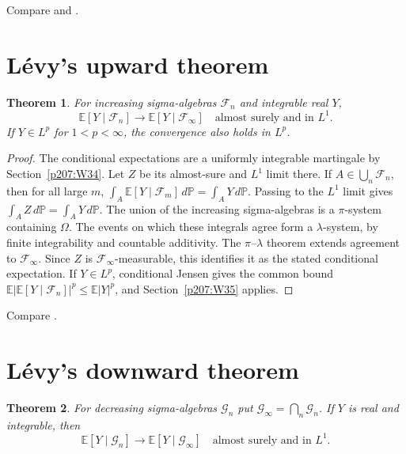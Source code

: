 \documentclass[11pt,oneside,openany]{book}
\theoremstyle{plain}
\newtheorem{theorem}{Theorem}[chapter]
\theoremstyle{definition}
\theoremstyle{remark}
\begin{document}
\noindent
Compare \cite[Chapter 14]{Williams} and
\cite[Corollary 9.23]{Kallenberg}.

\section{Lévy's upward theorem}
\label{p207:W36}

\begin{theorem}
For increasing sigma-algebras \(\mathcal F_n\) and integrable real \(Y\),
\[
 \mathbb E[Y\mid\mathcal F_n]\longrightarrow
 \mathbb E[Y\mid\mathcal F_\infty]
 \quad\text{almost surely and in }L^1.
\]
If \(Y\in L^p\) for \(1<p<\infty\), the convergence also holds in \(L^p\).
\end{theorem}

\begin{proof}
The conditional expectations are a uniformly integrable martingale
by Section~\ref{p207:W34}. Let \(Z\) be its almost-sure and \(L^1\)
limit there. If \(A\in\bigcup_n\mathcal F_n\), then for all large
\(m\), \(\int_A\mathbb E[Y\mid\mathcal F_m]\,d\mathbb P
=\int_A Y\,d\mathbb P\). Passing to the \(L^1\) limit gives
\(\int_A Z\,d\mathbb P=\int_A Y\,d\mathbb P\).
The union of the increasing sigma-algebras is a \(\pi\)-system
containing \(\Omega\). The events on which these integrals agree
form a \(\lambda\)-system, by finite integrability and countable
additivity. The \(\pi\)--\(\lambda\) theorem extends agreement to
\(\mathcal F_\infty\). Since \(Z\) is \(\mathcal F_\infty\)-measurable,
this identifies it as the stated conditional expectation.
If \(Y\in L^p\), conditional Jensen gives the common bound
\(\mathbb E|\mathbb E[Y\mid\mathcal F_n]|^p\le\mathbb E|Y|^p\),
and Section~\ref{p207:W35} applies.
\end{proof}

\noindent
Compare \cite[Sections 14.1--14.2]{Williams}.

\section{Lévy's downward theorem}
\label{p207:W37}

\begin{theorem}
For decreasing sigma-algebras \(\mathcal G_n\) put
\(\mathcal G_\infty=\bigcap_n\mathcal G_n\). If \(Y\) is real
and integrable, then
\[
 \mathbb E[Y\mid\mathcal G_n]\longrightarrow
 \mathbb E[Y\mid\mathcal G_\infty]
 \quad\text{almost surely and in }L^1.
\]
\end{theorem}
\end{document}
